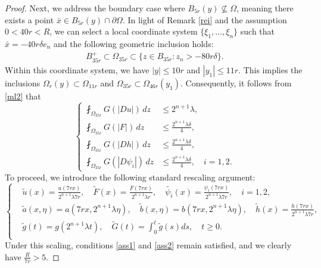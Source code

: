 \documentclass[10pt,a4paper]{article}
\theoremstyle{definition}
\numberwithin{equation}{section}
\begin{document}
\begin{proof}
 	
 	Next, we address the boundary case where $B_{5r}(y) \nsubseteq \Omega$, meaning there exists a point $\bar{x} \in B_{5r}(y) \cap \partial\Omega$. In light of Remark \ref{rei} and the assumption $0 < 40r < R$, we can select a local coordinate system $\{\xi_1, \ldots, \xi_n\}$ such that $\bar{x} = -40r\delta e_n$ and the following geometric inclusion holds:
 	\begin{align}\label{rei2}
 		B^+_{35r}\subset \Omega_{35r}
 		\subset
 		\{z\in B_{35r}:z_n>-80r\delta\}.
 	\end{align}
 	Within this coordinate system, we have $|y| \leq 10r$ and $|y_1| \leq 11r$. This implies the inclusions $\Omega_r(y) \subset \Omega_{11r}$ and $\Omega_{35r} \subset \Omega_{46r}(y_1)$. Consequently, it follows from \eqref{ml2} that
 		\begin{equation}\label{rei3}
 		\left\{
 		\begin{aligned}
 			 	\fint_{\Omega_{35r}}G(|Du|)\,dz
 			 &\leq 2^{n+1}\lambda, \\[0.15cm]
 		 \fint_{\Omega_{35r}}G(|F|)\,dz
 		 &\leq \frac{2^{n+1}\lambda\delta}{4}, \\[0.15cm]
 		 \fint_{\Omega_{35r}}G(|Dh|)\,dz
 		 &\leq \frac{2^{n+1}\lambda\delta}{4}, \\[0.15cm]
 		 \fint_{\Omega_{35r}}G(|D\psi_i|)\,dz
 		 &\leq \frac{2^{n+1}\lambda\delta}{4}, \quad i=1,2.
 		\end{aligned}
 		\right.
 	\end{equation}
 	To proceed, we introduce the following standard rescaling argument:
 	\begin{equation*} 
 		\left\{
 		\begin{aligned}
 			&\tilde{u}(x) = \frac{u(7rx)}{2^{n+1} \lambda 7r}, \quad \tilde{F}(x) = \frac{F( 7rx)}{2^{n+1} \lambda r},  \quad \tilde{\psi_i}(x) = \frac{\psi_i(7 rx)}{2^{n+1} \lambda 7r}, \quad  i=1,2, \\[0.15cm]
 			&\tilde{a}(x,\eta) = a(7 rx,2^{n+1} \lambda \eta), \quad 	\tilde{b}(x,\eta) = b( 7rx,2^{n+1}\lambda \eta), \quad \tilde{h}(x) = \frac{h(7 rx)}{2^{n+1} \lambda 7r},   \\[0.15cm]
 			&\tilde{g}(t) = g(2^{n+1}\lambda t), \quad \tilde{G}(t) =\int_0^t \tilde{g}(s) ds, \quad t \geq 0.  \\[0.15cm]
 		\end{aligned}
 		\right.
 	\end{equation*} 
 	Under this scaling, conditions \eqref{ass1} and \eqref{ass2} remain satisfied, and we clearly have $\frac{R}{7r} > 5$.

\end{proof}
\end{document}
